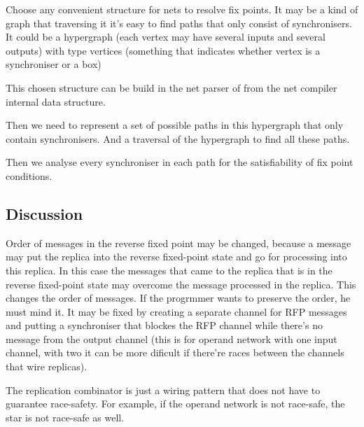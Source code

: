 Choose any convenient structure for nets to resolve fix points. It may be a kind of graph that traversing it it's easy to find paths that only consist of synchronisers.
It could be a hypergraph (each vertex may have several inputs and several outputs) with type vertices (something that indicates whether vertex is a synchroniser or a box)

This chosen structure can be build in the net parser of from the net compiler internal data structure.

Then we need to represent a set of possible paths in this hypergraph that only contain synchronisers. And a traversal of the hypergraph to find all these paths.

Then we analyse every synchroniser in each path for the satisfiability of fix point conditions.


    \subsection{Discussion}
Order of messages in the reverse fixed point may be changed, because a message may put the replica into the reverse fixed-point state and go for processing into this replica. In this case the messages that came to the replica that is in the reverse fixed-point state may overcome the message processed in the replica. This changes the order of messages. If the progrmmer wants to preserve the order, he must mind it. It may be fixed by creating a separate channel for RFP messages and putting a synchroniser that blockes the RFP channel while there's no message from the output channel (this is for operand network with one input channel, with two it can be more dificult if there're races between the channels that wire replicas).

The replication combinator is just a wiring pattern that does not have to guarantee race-safety. For example, if the operand network is not race-safe, the star is not race-safe as well.

